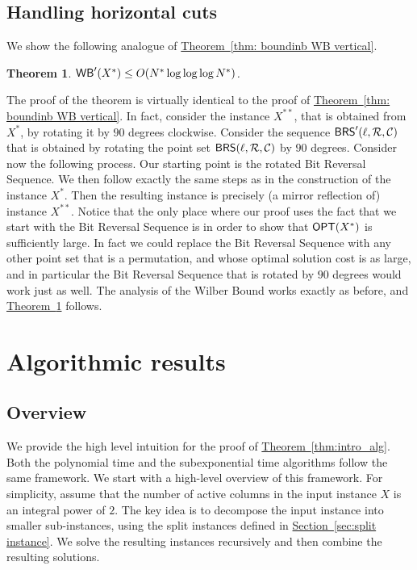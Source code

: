 \documentclass[11pt]{article}
\numberwithin{equation}{section}
\newtheorem{theorem}{Theorem}[section]
\theoremstyle{definition}
\theoremstyle{plain}
\newcommand{\expref}[2]{\hyperref[#2]{#1~\ref{#2}}}
\begin{document}
%
%
%
%
\subsection{Handling horizontal cuts}\label{subsec: bounding WB horizontal}
%
%
%
%
We show the following analogue of \expref{Theorem}{thm: boundinb WB vertical}.

\begin{theorem}\label{thm: boundinb WB horizontal}
	$\mathsf{WB}'(X^*)\leq O(N^*\log\log\log N^*)$.
\end{theorem}

The proof of the theorem is virtually identical to the proof of \expref{Theorem}{thm: boundinb WB vertical}. 
In fact, consider the instance $X^{**}$, that is obtained from $X^*$, by rotating it by $90$ degrees clockwise.
Consider the sequence $\mathsf{BRS}'(\ell, {\mathcal R}, {\mathcal C})$ that is obtained by rotating the point set $\mathsf{BRS}(\ell, {\mathcal R}, {\mathcal C})$ by $90$ degrees.  
%
Consider now the following process. Our starting point is the rotated Bit Reversal Sequence. We then follow exactly the same steps as in the construction of the instance $X^*$. 
Then the resulting instance is precisely (a mirror reflection of) instance $X^{**}$.
Notice that the only place where our proof uses the fact that we start with the Bit Reversal Sequence is in order to show that $\mbox{\sf OPT}(X^*)$ is sufficiently large. In fact we could replace the Bit Reversal Sequence with any other point set that is a permutation, and whose optimal solution cost is as large, and in particular the Bit Reversal Sequence that is rotated by $90$ degrees would work just as well. The analysis of the Wilber Bound works exactly as before, and \expref{Theorem}{thm: boundinb WB horizontal} follows.




%

\section{Algorithmic results} 
\label{sec: algo} 
\newcommand{\pedit}[1]{\textcolor{red}{#1}}

\subsection{Overview} 

We provide the high level intuition for the proof of \expref{Theorem}{thm:intro_alg}. Both the polynomial time and the subexponential time algorithms follow the same framework. We start with a high-level overview of this framework. For simplicity, assume that the number of active columns in the input instance $X$ is an integral power of $2$.
The key idea is to decompose the input instance into smaller sub-instances,  using the split instances defined in \expref{Section}{sec:split instance}. We solve the resulting instances recursively and then combine the resulting solutions.
\end{document}
